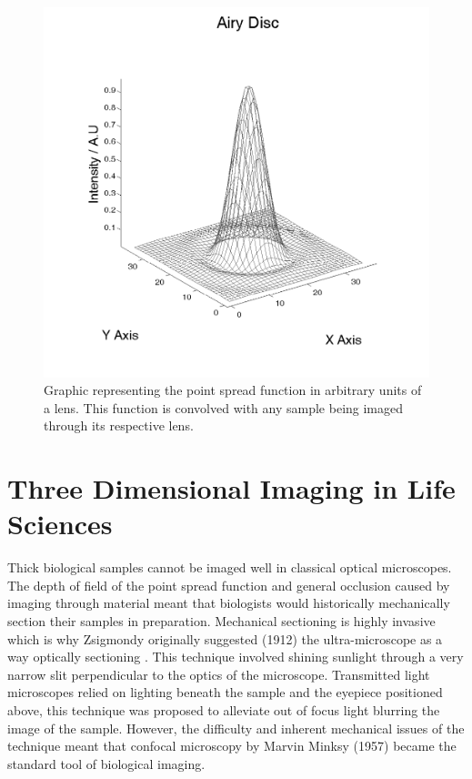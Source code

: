 \begin{figure}
	\centering
	\includegraphics[width=0.6\linewidth]{Airy_Disc}
	\caption[Airy Disc]{Graphic representing the point spread function in arbitrary units of a lens. This function is convolved with any sample being imaged through its respective lens.}
	\label{fig:Airy_Disc}
\end{figure}


%

\section{Three Dimensional Imaging in Life Sciences}


Thick biological samples cannot be imaged well in classical optical microscopes. The depth of field of the point spread function and general occlusion caused by imaging through material meant that biologists would historically mechanically section their samples in preparation. Mechanical sectioning is highly invasive which is why Zsigmondy originally suggested (1912) the ultra-microscope as a way optically sectioning \cite{Mappes2012}. This technique involved shining sunlight through a very narrow slit perpendicular to the optics of the microscope. Transmitted light microscopes relied on lighting beneath the sample and the eyepiece positioned above, this technique was proposed to alleviate out of focus light blurring the image of the sample. However, the difficulty and inherent mechanical issues of the technique meant that confocal microscopy by Marvin Minksy (1957) \cite{Minsky1957} became the standard tool of biological imaging.

